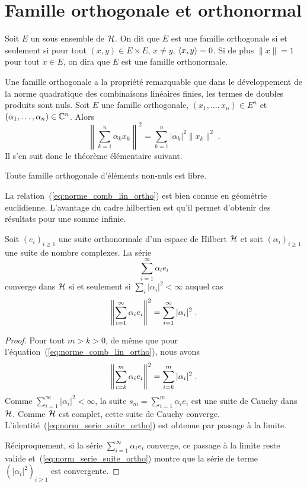 \section{Famille orthogonale et orthonormal}
\begin{definition}
Soit $E$ un sous ensemble de $\mathcal{H}$. On dit que $E$
est une famille orthogonale si et seulement si pour tout $(x,y) \in E \times E$,
$x \ne y$, $\left\langle x, y \right\rangle= 0$. Si de plus   $\|x\|=1$ pour tout $x \in E$, on
dira que $E$ est une famille orthonormale.
\end{definition}
Une famille orthogonale a la propri\'{e}t\'{e} remarquable que dans le d\'{e}veloppement de
la norme quadratique des combinaisons lin\'{e}aires finies, les termes de doubles
produits sont nuls. Soit $E$ une famille orthogonale, $(x_1,\dots,x_n) \in E^n$
et $(\alpha_1,\dots,\alpha_n) \in \mathbb{C}^n$. Alors
\begin{equation}
  \label{eq:norme_comb_lin_ortho}
\left\|\sum_{k=1}^n\alpha_k x_k\right\|^2= \sum_{k=1}^n |\alpha_k|^2
\|x_k\|^2\;.
\end{equation}
Il s'en suit donc le th\'{e}or\`{e}me \'{e}l\'{e}mentaire suivant.
\begin{theorem}
  Toute famille orthogonale d'\'{e}l\'{e}ments non-nuls est libre.
\end{theorem}
La relation~(\ref{eq:norme_comb_lin_ortho}) est bien connue en g\'{e}om\'{e}trie
euclidienne. L'avantage du cadre hilbertien est qu'il permet d'obtenir des
r\'{e}sultats pour une somme infinie.
\begin{theorem}
\label{theo:convergence-series-fourier}
Soit $(e_i)_{i\geq1}$ une suite orthonormale d'un espace de Hilbert $\mathcal{H}$ et
soit $(\alpha_i)_{i\geq1}$ une suite de nombre complexes. La s\'{e}rie
\begin{equation}
  \label{eq:serie_suite_ortho}
  \sum_{i=1}^\infty  \alpha_i e_i
\end{equation}
converge dans $\mathcal{H}$ si et seulement si $\sum_{i} |\alpha_i|^2 <
\infty$ auquel cas
\begin{equation}
  \label{eq:norm_serie_suite_ortho}
\left\| \sum_{i=1}^\infty \alpha_i e_i \right\|^2 =
\sum_{i=1}^\infty |\alpha_i|^2 \;.
\end{equation}
\end{theorem}
\begin{proof}\smartqed
Pour tout $m > k > 0$, de m\^{e}me que pour
l'\'{e}quation~(\ref{eq:norme_comb_lin_ortho}), nous avons
\[
\left\| \sum_{i=k}^m \alpha_i e_i \right\|^2 = \sum_{i=k}^m |\alpha_i|^2 \;.
\]
Comme $\sum_{i=1}^\infty |\alpha_i|^2 < \infty$, la suite $s_m= \sum_{i=1}^m
\alpha_i e_i$ est une suite de Cauchy dans $\mathcal{H}$. Comme $\mathcal{H}$ est complet,
cette suite de Cauchy converge. L'identit\'{e}~(\ref{eq:norm_serie_suite_ortho})
est obtenue par passage \`{a} la limite.

R\'{e}ciproquement, si la s\'{e}rie $\sum_{i=1}^\infty \alpha_i e_i$ converge, ce
passage \`{a} la limite reste valide
et~(\ref{eq:norm_serie_suite_ortho}) montre que la s\'{e}rie de terme
$(|\alpha_i|^2)_{i\geq1}$ est convergente.

\end{proof}
